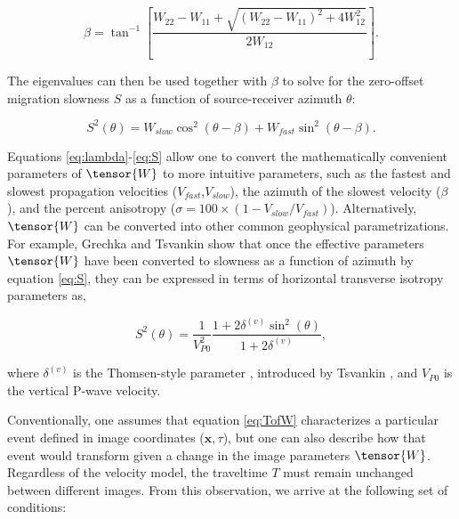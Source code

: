 \begin{equation}
\label{eq:beta}
\beta = \tan ^{-1}\left[ \frac{W_{22}-W_{11}+\sqrt{\left(W_{22}-W_{11}\right)^2+4W_{12}^2}}{2W_{12}}\right].
\end{equation}


\noindent The eigenvalues can then be used together with $\beta $ to solve for the zero-offset migration slowness $S$ as a function of source-receiver azimuth $\theta $:

\begin{equation}
\label{eq:S}
S^2(\theta )=W_{slow}\cos^2(\theta -\beta )+W_{fast}\sin^2(\theta -\beta).
\end{equation}

Equations \ref{eq:lambda}-\ref{eq:S} allow one to convert the mathematically convenient parameters of $\tensor{W}$ to more intuitive parameters, such as the fastest and slowest propagation velocities ($V_{fast}$,$V_{slow}$), the azimuth of the slowest velocity ($\beta $), and the percent anisotropy ($\sigma = 100\times \left( 1-V_{slow}/V_{fast}\right)$).
Alternatively, $\tensor{W}$ can be converted into other common geophysical parametrizations. 
For example, Grechka and Tsvankin \cite{GEO63-03-10791092} show that once the effective parameters $\tensor{W}$ have been converted to slowness as a function of azimuth by equation \ref{eq:S}, they can be expressed in terms of horizontal transverse isotropy parameters as,

\begin{equation}
\label{eq:thomsen-GT98-HTI}
S^2(\theta )=\frac{1}{V_{P0}^2}\frac{1+2\delta ^{(v)}\sin^2(\theta)}{1+2\delta ^{(v)}},
\end{equation}

\noindent where $\delta ^{(v)}$ is the Thomsen-style parameter \cite{GEO51-10-19541966}, introduced by Tsvankin \cite{GEO62-02-06140629}, and $V_{P0}$ is the vertical P-wave velocity.

Conventionally, one assumes that equation \ref{eq:TofW} characterizes a particular event defined in image coordinates ($\mathbf{x},\tau $), but one can also describe how that event would transform given a change in the image parameters $\tensor{W}$. Regardless of the velocity model, the traveltime $T$ must remain unchanged between different images.  From this observation, we arrive at the following set of conditions:

